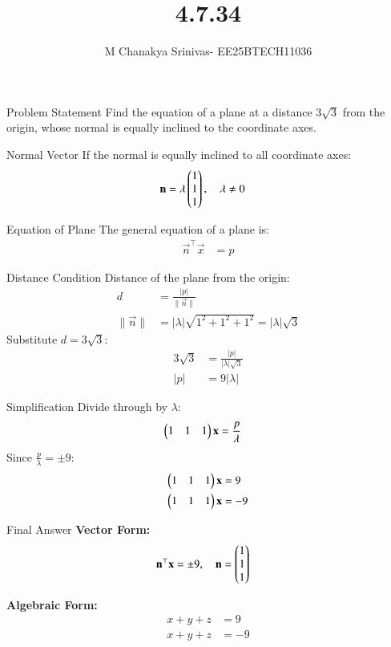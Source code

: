\documentclass{beamer}
\title %
{4.7.34}
\date{}
\author %
{M Chanakya Srinivas- EE25BTECH11036}
\begin{document}
\frame{\titlepage}


\begin{frame}{Problem Statement}
Find the equation of a plane at a distance $3\sqrt{3}$ from the origin, 
whose normal is equally inclined to the coordinate axes.
\end{frame}

\begin{frame}{Normal Vector}
If the normal is equally inclined to all coordinate axes:
\begin{align}
\mathbf{n} &= \lambda \begin{pmatrix}1\\1\\1\end{pmatrix}, \quad \lambda \neq 0
\end{align}
\end{frame}

\begin{frame}{Equation of Plane}
The general equation of a plane is:
\begin{align}
\vec{n}^\top \vec{x} &= p
\end{align}
\end{frame}

\begin{frame}{Distance Condition}
Distance of the plane from the origin:
\begin{align}
d &= \frac{|p|}{\|\vec{n}\|} \\
\|\vec{n}\| &= |\lambda|\sqrt{1^2+1^2+1^2} = |\lambda|\sqrt{3}
\end{align}
Substitute $d = 3\sqrt{3}$:
\begin{align}
3\sqrt{3} &= \frac{|p|}{|\lambda|\sqrt{3}} \\
|p| &= 9|\lambda|
\end{align}
\end{frame}

\begin{frame}{Simplification}
Divide through by $\lambda$:
\begin{align}
\begin{pmatrix}1 & 1 & 1\end{pmatrix}\mathbf{x} &= \frac{p}{\lambda}
\end{align}
Since $\tfrac{p}{\lambda} = \pm 9$:
\begin{align}
\begin{pmatrix}1 & 1 & 1\end{pmatrix}\mathbf{x} &= 9 \\
\begin{pmatrix}1 & 1 & 1\end{pmatrix}\mathbf{x} &= -9
\end{align}
\end{frame}

\begin{frame}{Final Answer}
\textbf{Vector Form:}
\begin{align}
\mathbf{n}^\top \mathbf{x} &= \pm 9, \quad 
\mathbf{n} = \begin{pmatrix}1\\1\\1\end{pmatrix}
\end{align}

\textbf{Algebraic Form:}
\begin{align}
x+y+z &= 9 \\
x+y+z &= -9
\end{align}
\end{frame}
\end{document}
